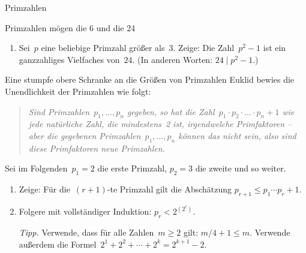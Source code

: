 \documentclass{uebblatt}
\begin{document}
\begin{blatt}{Primzahlen}
\begin{aufgabe}{Primzahlen mögen die 6 und die 24}
\begin{enumerate}
{\scriptsize\emph{Tipp.} Eine Zahl ist genau dann ein Vielfaches von~$6$, wenn sie ein
Vielfaches von~$2$ und von~$3$ ist. Weißt du von den drei Zahlen~$p-1$,~$p$
und~$p+1$, ob sie ein Vielfaches von~$3$ sind?\par}

\item Sei~$p$ eine beliebige Primzahl größer als~$3$.
Zeige: Die Zahl~$p^2 - 1$ ist ein ganzzahliges Vielfaches von~$24$.
(In anderen Worten: $24 \mid p^2 - 1$.)
\end{enumerate}
\end{aufgabe}

\begin{aufgabe}{Eine stumpfe obere Schranke an die Größen von Primzahlen}
Euklid bewies die Unendlichkeit der Primzahlen wie folgt:
\begin{quote}
\emph{Sind Primzahlen~$p_1,\ldots,p_n$ gegeben, so hat die Zahl~$p_1 \cdot p_2 \cdot \ldots \cdot p_n
+ 1$ wie jede natürliche Zahl, die mindestens~2 ist, irgendwelche Primfaktoren
-- aber die gegebenen Primzahlen~$p_1,\ldots,p_n$ können das nicht sein, also
sind diese Primfaktoren neue Primzahlen.}
\end{quote}
Sei im Folgenden~$p_1 = 2$ die erste Primzahl, $p_2 = 3$ die zweite und so
weiter.
\begin{enumerate}
\item Zeige: Für die~$(r+1)$-te Primzahl gilt die Abschätzung
$p_{r+1} \leq p_1 \cdots p_r + 1$.
\item Folgere mit vollständiger Induktion: $p_r < 2^{(2^r)}$.

{\scriptsize\emph{Tipp.} Verwende, dass für alle Zahlen~$m \geq 2$ gilt: $m/4 +
1 \leq m$. Verwende außerdem die Formel~$2^1 + 2^2 + \cdots + 2^k = 2^{k+1} -
2$.\par}
\end{enumerate}
\end{aufgabe}

\end{blatt}
\end{document}
